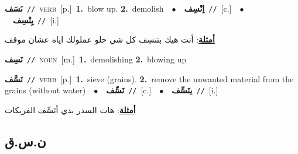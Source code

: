 \documentclass[10pt,a4paper,twoside]{article} %
\begin{document}
\begin{multicols}{2}
{\setlength\topsep{0pt}\textbf{\foreignlanguage{arabic}{نَسَف}}\ {\color{gray}\texttt{//}\color{black}}\ \textsc{verb}\ [p.]\ \textbf{1.}~blow up.  \textbf{2.}~demolish\ \ $\bullet$\ \ \setlength\topsep{0pt}\textbf{\foreignlanguage{arabic}{اِنْسِف}}\ {\color{gray}\texttt{//}\color{black}}\ [c.]\ \ $\bullet$\ \ \setlength\topsep{0pt}\textbf{\foreignlanguage{arabic}{يِنْسِف}}\ {\color{gray}\texttt{//}\color{black}}\ [i.]\  \begin{flushright}\color{gray}\foreignlanguage{arabic}{\textbf{\underline{\foreignlanguage{arabic}{أمثلة}}}: أنت هيك بتنسِف كل شي حلو عملولك اياه عشان موقف}\end{flushright}\color{black}} \vspace{2mm}

{\setlength\topsep{0pt}\textbf{\foreignlanguage{arabic}{نَسِف}}\ {\color{gray}\texttt{//}\color{black}}\ \textsc{noun}\ [m.]\ \textbf{1.}~demolishing  \textbf{2.}~blowing up\ } \vspace{2mm}

{\setlength\topsep{0pt}\textbf{\foreignlanguage{arabic}{نَسَّف}}\ {\color{gray}\texttt{//}\color{black}}\ \textsc{verb}\ [p.]\ \textbf{1.}~sieve (grains).  \textbf{2.}~remove the unwanted material from the grains (without water)\ \ $\bullet$\ \ \setlength\topsep{0pt}\textbf{\foreignlanguage{arabic}{نَسِّف}}\ {\color{gray}\texttt{//}\color{black}}\ [c.]\ \ $\bullet$\ \ \setlength\topsep{0pt}\textbf{\foreignlanguage{arabic}{ينَسِّف}}\ {\color{gray}\texttt{//}\color{black}}\ [i.]\  \begin{flushright}\color{gray}\foreignlanguage{arabic}{\textbf{\underline{\foreignlanguage{arabic}{أمثلة}}}: هات السدر بدي أنَسِّف الفريكات}\end{flushright}\color{black}} \vspace{2mm}

\vspace{-3mm}
\subsection*{\color{blue}\foreignlanguage{arabic}{ن.س.ق}\color{blue}{}} 


\end{multicols}
\end{document}
